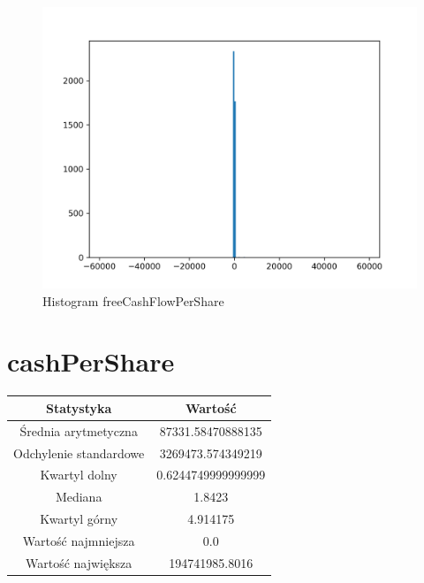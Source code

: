 \documentclass{article}
\begin{document}
\begin{figure}[h!]
    \includegraphics[width=\linewidth]{variables/freeCashFlowPerShare.png}
    \caption{Histogram freeCashFlowPerShare }
\end{figure}\section{ cashPerShare }

\begin{center}
    \begin{tabular}{|c | c|} 
    \hline
    Statystyka & Wartość \\
    \hline\hline
    Średnia arytmetyczna & 87331.58470888135 \\ 
    \hline
    Odchylenie standardowe & 3269473.574349219 \\
    \hline
    Kwartyl dolny & 0.6244749999999999 \\
    \hline
    Mediana & 1.8423 \\
    \hline
    Kwartyl górny & 4.914175 \\
    \hline
    Wartość najmniejsza & 0.0 \\
    \hline
    Wartość największa & 194741985.8016 \\
    \hline
   \end{tabular}
\end{center}
\end{document}
